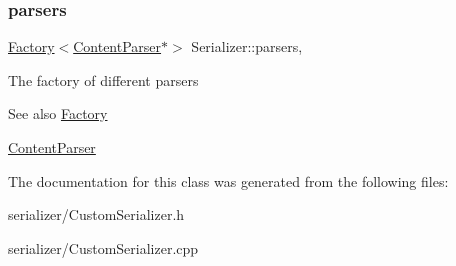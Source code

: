 \subsubsection{\texorpdfstring{parsers}{parsers}}
{\footnotesize\ttfamily \mbox{\hyperlink{classFactory}{Factory}}$<$\mbox{\hyperlink{classContentParser}{Content\+Parser}}$\ast$$>$ Serializer\+::parsers\hspace{0.3cm}{\ttfamily [protected]}, {\ttfamily [inherited]}}

The factory of different parsers \begin{DoxySeeAlso}{See also}
\mbox{\hyperlink{classFactory}{Factory}} 

\mbox{\hyperlink{classContentParser}{Content\+Parser}} 
\end{DoxySeeAlso}


The documentation for this class was generated from the following files\+:\begin{DoxyCompactItemize}
\item 
serializer/Custom\+Serializer.\+h\item 
serializer/Custom\+Serializer.\+cpp\end{DoxyCompactItemize}
